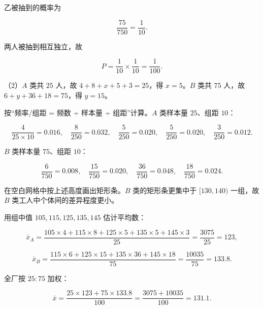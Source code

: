 \begin{answer}
乙被抽到的概率为

\nopagebreak[4]
\[\frac{75}{750}=\frac1{10}.\]

两人被抽到相互独立，故

\nopagebreak[4]
\[P=\frac1{10}\times\frac1{10}=\frac1{100} .\]

（2）$A$ 类共 $25$ 人，故 $4+8+x+5+3=25$，得 $x=5$。$B$ 类共 $75$ 人，故 $6+y+36+18=75$，得 $y=15$。

按“频率/组距 = 频数 ÷ 样本量 ÷ 组距”计算。$A$ 类样本量 $25$、组距 $10$：

\nopagebreak[4]
\[\frac4{25\times10}=0.016,\quad \frac8{250}=0.032,\quad \frac5{250}=0.020,\quad \frac5{250}=0.020,\quad \frac3{250}=0.012 .\]

$B$ 类样本量 $75$、组距 $10$：

\nopagebreak[4]
\[\frac6{750}=0.008,\quad \frac{15}{750}=0.020,\quad \frac{36}{750}=0.048,\quad \frac{18}{750}=0.024 .\]

在空白网格中按上述高度画出矩形条。$B$ 类的矩形条更集中于 $[130,140)$ 一组，故 $B$ 类工人中个体间的差异程度更小。

用组中值 $105,115,125,135,145$ 估计平均数：

\nopagebreak[4]
\[\bar x_A=\frac{105\times4+115\times8+125\times5+135\times5+145\times3}{25}=\frac{3075}{25}=123,\]

\nopagebreak[4]
\[\bar x_B=\frac{115\times6+125\times15+135\times36+145\times18}{75}=\frac{10035}{75}=133.8 .\]

全厂按 $25:75$ 加权：

\nopagebreak[4]
\[\bar x=\frac{25\times123+75\times133.8}{100}=\frac{3075+10035}{100}=131.1 .\]


\end{answer}
